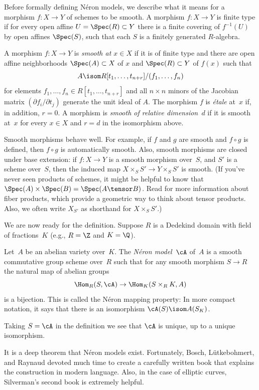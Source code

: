 \documentclass{report}
\begin{document}
Before formally defining N\'eron models, we describe what it means
for a morphism $f:X\to Y$ of schemes to be smooth.  A morphism
$f:X\to Y$ is finite type if for every open affine
$U=\Spec(R)\subset Y$ there is a finite covering of $f^{-1}(U)$ by
open affines $\Spec(S)$, such that each $S$ is a finitely
generated $R$-algebra.
\begin{definition} A morphism $f:X\to Y$ is {\em smooth at
$x\in X$} if it is of finite type and there are open affine
neighborhoods $\Spec(A)\subset X$ of $x$ and $\Spec(R)\subset Y$
of $f(x)$ such that
\[
  A \isom R[t_1,\ldots, t_{n+r}]/(f_1,\ldots, f_n)
\]
for elements $f_1,\ldots, f_n\in R[t_1,\ldots, t_{n+r}]$ and all
$n\times n$ minors of the Jacobian matrix $(\partial f_i/ \partial
t_j)$ generate the unit ideal of $A$.  The morphism $f$ is {\em
\'etale} at~$x$ if, in addition, $r=0$.  A morphism is {\em smooth
of relative dimension~$d$} if it is smooth at~$x$ for every $x\in
X$ and $r=d$ in the isomorphism above.
\end{definition}

Smooth morphisms behave well.  For example, if $f$ and $g$ are
smooth and $f\circ g$ is defined, then $f\circ g$ is automatically
smooth.  Also, smooth morphisms are closed under base extension:
if $f:X\to Y$ is a smooth morphism over~$S$, and $S'$ is a scheme
over~$S$, then the induced map $X\times_S S' \to Y\times_S S'$ is
smooth.   (If you've never seen products of schemes, it might be
helpful to know that $\Spec(A)\times\Spec(B) = \Spec(A\tensor B)$.
Read \cite[\S{}II.3]{hartshorne} for more information about fiber
products, which provide a geometric way to think about tensor
products.  Also, we often write $X_{S'}$ as shorthand for
$X\times_S S'$.)

We are now ready for the definition. Suppose $R$ is a Dedekind
domain with field of fractions~$K$ (e.g., $R=\Z$ and $K=\Q$).
\begin{definition}
Let~$A$ be an abelian variety over~$K$.  The {\em N\'eron
model}~$\cA$ of~$A$ is a smooth commutative group scheme over~$R$
such that for any smooth morphism $S\to R$ the natural map of
abelian groups
\[
  \Hom_R(S,\cA) \to \Hom_K(S\times_R K, A)
\]
is a bijection.  This is called the N\'eron mapping property: In
more compact notation, it says that there is an isomorphism
$\cA(S) \isom A(S_K)$.
\end{definition}
Taking $S=\cA$ in the definition we see that $\cA$ is unique, up
to a unique isomorphism.

It is a deep theorem that N\'eron models exist. Fortunately,
Bosch, L\"utkebohmert, and Raynaud devoted much time to create a
carefully written book \cite{neronmodels} that explains the
construction in modern language.  Also, in the case of elliptic
curves, Silverman's second book \cite{silverman:aec2} is extremely
helpful.
\end{document}
